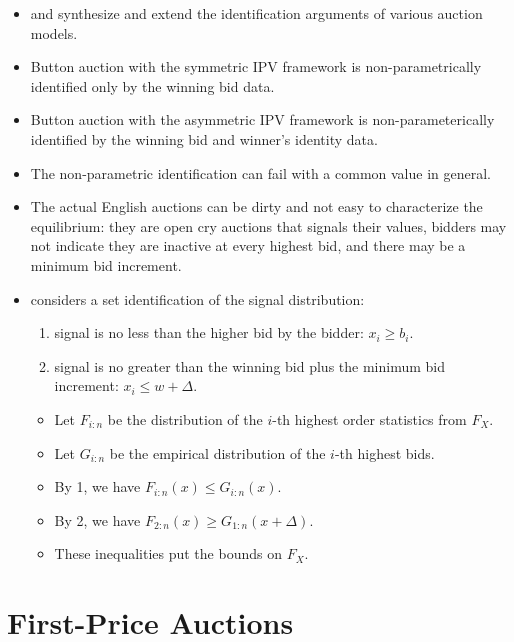 \documentclass[
]{book}
\providecommand{\tightlist}{%
  \setlength{\itemsep}{0pt}\setlength{\parskip}{0pt}}
\begin{document}
\begin{itemize}
\tightlist
\item
  \citet{atheyIdentificationStandardAuction2002} and \citet{atheyChapter60Nonparametric2007} synthesize and extend the identification arguments of various auction models.
\item
  Button auction with the symmetric IPV framework is non-parametrically identified only by the winning bid data.
\item
  Button auction with the asymmetric IPV framework is non-parameterically identified by the winning bid and winner's identity data.
\item
  The non-parametric identification can fail with a common value in general.
\item
  The actual English auctions can be dirty and not easy to characterize the equilibrium: they are open cry auctions that signals their values, bidders may not indicate they are inactive at every highest bid, and there may be a minimum bid increment.
\item
  \citet{haileInferenceIncompleteModel2003} considers a set identification of the signal distribution:

  \begin{enumerate}
  \def\labelenumi{\arabic{enumi}.}
  \tightlist
  \item
    signal is no less than the higher bid by the bidder: \(x_i \ge b_i\).
  \item
    signal is no greater than the winning bid plus the minimum bid increment: \(x_i \le w + \Delta\).
  \end{enumerate}

  \begin{itemize}
  \tightlist
  \item
    Let \(F_{i:n}\) be the distribution of the \(i\)-th highest order statistics from \(F_X\).
  \item
    Let \(G_{i:n}\) be the empirical distribution of the \(i\)-th highest bids.
  \item
    By 1, we have \(F_{i:n}(x) \le G_{i:n}(x)\).
  \item
    By 2, we have \(F_{2:n}(x) \ge G_{1:n}(x + \Delta)\).
  \item
    These inequalities put the bounds on \(F_X\).
  \end{itemize}
\end{itemize}

\hypertarget{first-price-auctions}{%
\section{First-Price Auctions}\label{first-price-auctions}}
\end{document}
